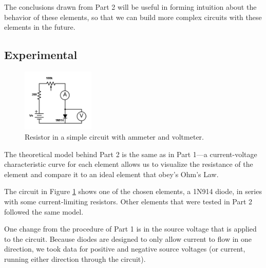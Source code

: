 \documentclass[a4paper, 11pt]{article}
\begin{document}

        The conclusions drawn from Part 2 will be useful in forming intuition about the behavior of these elements, so that we can build more complex circuits with these elements in the future.

    \subsection{Experimental}

        \begin{figure}
            \vspace{-25pt}
            \centering
            \includegraphics[height=3cm]{PH425-Lab1-2b.png}
            \caption{Resistor in a simple circuit with ammeter and voltmeter.}
            \label{fig:circuit-2}
        \end{figure}


        The theoretical model behind Part 2 is the same as in Part 1---a current-voltage characteristic curve for each element allows us to visualize the resistance of the element and compare it to an ideal element that obey's Ohm's Law. \


        The circuit in Figure \ref{fig:circuit-2} shows one of the chosen elements, a 1N914 diode, in series with some current-limiting resistors. Other elements that were tested in Part 2 followed the same model. \


        One change from the procedure of Part 1 is in the source voltage that is applied to the circuit. Because diodes are designed to only allow current to flow in one direction, we took data for positive and negative source voltages (or current, running either direction through the circuit).
\end{document}
